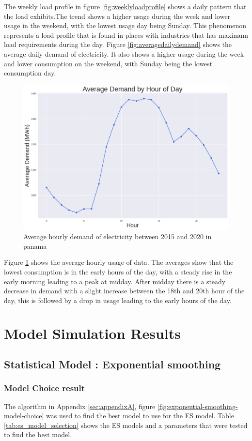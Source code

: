   
The weekly load profile in figure \ref{fig:weeklyloadprofile} shows a daily pattern that the load exhibits.The trend shows a higher usage during the week and lower usage in the weekend, with the lowest usage day being Sunday. This phenomenon represents a load profile that is found in places with industries that has maximum load requirements during the day. Figure \ref{fig:averagedailydemand} shows the average daily demand  of electricity. It also shows a higher usage during the week and lower consumption on the weekend, with Sunday being the lowest consumption day. 
  \begin{figure}[h]
  	\centering
  	\includegraphics[width=0.45\linewidth]{Chapters/images/results/average_hourly_demand}
  	\caption{Average hourly demand of electricity between 2015 and 2020 in panama}
  	\label{fig:averagehourlydemand}
  \end{figure}
  
  Figure \ref{fig:averagehourlydemand} shows the average hourly usage of data. The averages show that the lowest consumption is in the early hours of the day, with a steady rise in the early morning leading to a peak at midday. After midday there is a steady decrease in demand with a slight increase between the 18th and 20th hour of the day, this is followed by a drop in usage leading to the early hours of the day.  


\section{Model Simulation Results}

\subsection{Statistical Model : Exponential smoothing}
\subsubsection{Model Choice result}
The algorithm in Appendix \ref{sec:appendixA}, figure \ref{fig:exponential-smoothing-model-choice} was used to find the best model to use for the ES model. Table \ref{tab:es_model_selection} shows the ES models and a parameters that were tested to find the best model.

